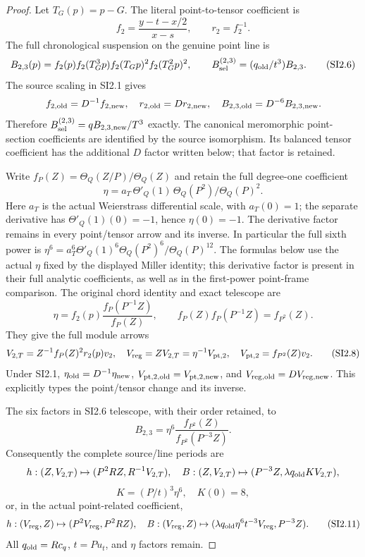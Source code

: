 \begin{proof}
\par\nobreak

Let \(T_G(p)=p-G\). The literal point-to-tensor coefficient is
\[
 f_2=\frac{y-t-x/2}{x-s},\qquad r_2=f_2^{-1}.
\]
The full chronological suspension on the genuine point line is
\[
 B_{2,3}(p)=f_2(p)f_2(T_G^3p)
                 f_2(T_Gp)^2f_2(T_G^2p)^2,\qquad
 B_{\rm sel}^{(2,3)}=(q_{\rm old}/t^3)B_{2,3}.
 \tag{SI2.6}
\]
The source scaling in SI2.1 gives
\[
 f_{2,\rm old}=D^{-1}f_{2,\rm new},\quad
 r_{2,\rm old}=D r_{2,\rm new},\quad
 B_{2,3,\rm old}=D^{-6}B_{2,3,\rm new}.
\]
Therefore \(B_{\rm sel}^{(2,3)}=q B_{2,3,\rm new}/T^3\)
exactly. The canonical meromorphic point-section coefficients are
identified by the source isomorphism. Its balanced tensor coefficient
has the additional \(D\) factor written below; that factor is retained.

Write \(f_P(Z)=\Theta_Q(Z/P)/\Theta_Q(Z)\) and retain the full
degree-one coefficient
\[
 \eta=a_T\,\Theta'_Q(1)\,\Theta_Q(P^2)/\Theta_Q(P)^2.
\]
Here \(a_T\) is the actual Weierstrass differential scale, with \(a_T(0)=1\); the separate derivative has \(\Theta'_Q(1)(0)=-1\), hence \(\eta(0)=-1\). The derivative factor remains in every point/tensor arrow and its inverse. In particular the full sixth power is \(\eta^6=a_T^6\Theta'_Q(1)^6\Theta_Q(P^2)^6/\Theta_Q(P)^{12}\). The formulas below use the actual \(\eta\) fixed by the displayed Miller identity; this derivative factor is present in their full analytic coefficients, as well as in the first-power point-frame comparison. The original chord identity and exact telescope are
\[
 \eta=f_2(p)\frac{f_P(P^{-1}Z)}{f_P(Z)},\qquad
 f_P(Z)f_P(P^{-1}Z)=f_{P^2}(Z).
 \tag{SI2.7}
\]
They give the full module arrows
\[
 V_{2,T}=Z^{-1}f_P(Z)^2r_2(p)v_2,\quad
 V_{\rm reg}=ZV_{2,T}=\eta^{-1}V_{{\rm pt},2},\quad
 V_{{\rm pt},2}=f_{P^2}(Z)v_2.
 \tag{SI2.8}
\]
Under SI2.1, \(\eta_{\rm old}=D^{-1}\eta_{\rm new}\),
\(V_{{\rm pt},2,\rm old}=V_{{\rm pt},2,\rm new}\), and
\(V_{\rm reg,old}=D V_{\rm reg,new}\). This explicitly types the
point/tensor change and its inverse.

The six factors in SI2.6 telescope, with their order retained, to
\[
 B_{2,3}=\eta^6
       \frac{f_{P^2}(Z)}{f_{P^2}(P^{-3}Z)}.
 \tag{SI2.9}
\]
Consequently the complete source/line periods are
\[
 h:(Z,V_{2,T})\mapsto(P^2RZ,R^{-1}V_{2,T}),\quad
 B:(Z,V_{2,T})\mapsto(P^{-3}Z,\lambda q_{\rm old}K V_{2,T}),
\]
\[
 K=(P/t)^3\eta^6,\quad K(0)=8,
 \tag{SI2.10}
\]
or, in the actual point-related coefficient,
\[
 h:(V_{\rm reg},Z)\mapsto(P^2V_{\rm reg},P^2RZ),\quad
 B:(V_{\rm reg},Z)\mapsto
   (\lambda q_{\rm old}\eta^6t^{-3}V_{\rm reg},P^{-3}Z).
 \tag{SI2.11}
\]
All \(q_{\rm old}=Rc_q\), \(t=Pu_t\), and \(\eta\) factors remain.


\end{proof}
